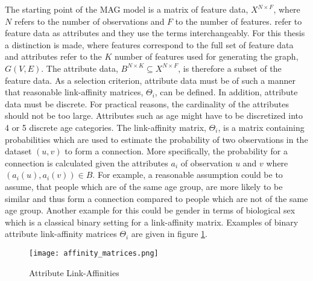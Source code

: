 	\noindent The starting point of the MAG model is a matrix of feature data, 
	$X^{N \times F}$, where $N$ refers to the number of observations 
	and $F$ to the number of features. \citeauthor{kim2012multiplicative} refer 
	to feature data as attributes and they use the terms interchangeably. For this 
	thesis a distinction is made, where features correspond to the full set of 
	feature data and attributes refer to the $K$ number of features used for 
	generating the graph, $G(V,E)$. The attribute data, 
	$B^{N \times K} \subseteq X^{N \times F}$, is therefore a subset of the 
	feature data. As a selection criterion, attribute data must be of such a 
	manner that reasonable link-affinity matrices, $\Theta_{i}$, can be 
	defined. In addition, attribute data must be discrete. For practical
	reasons, the cardinality of the attributes should not be too large.
	Attributes such as age might have to be discretized into 4 or 5 discrete
	age categories. The link-affinity matrix, $\Theta_{i}$, is a matrix
	containing probabilities which are used to estimate the probability of two 
	observations in the dataset $(u,v)$ to form a connection. More specifically, 
	the probability for a connection is calculated given the attributes $a_i$ of 
	observation $u$ and $v$ where $(a_{i}(u),a_{i}(v))\in B$. For example, a 
	reasonable assumption could be to assume, that people which are of the same 
	age group, are more likely to be similar and thus form a connection 
	compared to people which are not of the same age group. Another example for 
	this could be gender in terms of biological sex which is a classical binary 
	setting for a link-affinity matrix. Examples of binary attribute 
	link-affinity matrices $\Theta_i$ are given in 
	figure \ref{fig:link-affinity}.

	\begin{figure}[h]
		\centering
		\texttt{[image: affinity\_matrices.png]}
		\caption{Attribute Link-Affinities}
		\cite[p. 118]{kim2012multiplicative}
		\label{fig:link-affinity}
	\end{figure}

